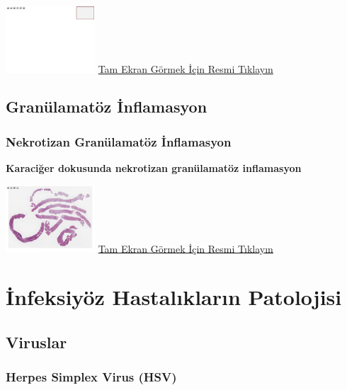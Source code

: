 \documentclass[
  letterpaper,
  DIV=11,
  numbers=noendperiod]{scrreprt}
\begin{document}
\href{https://images.patolojiatlasi.com/template/HE.html}{\includegraphics[width=0.25\textwidth,height=\textheight]{./screenshots/template_screenshot.png}}
\href{https://images.patolojiatlasi.com/chronic-pyelonephritis/HE.html}{Tam
Ekran Görmek İçin Resmi Tıklayın}

\hypertarget{sec-granulamatoz-inflamasyon}{%
\chapter{Granülamatöz İnflamasyon}\label{sec-granulamatoz-inflamasyon}}

\hypertarget{sec-nekrotizan-granulamatoz-inflamasyon}{%
\section{Nekrotizan Granülamatöz
İnflamasyon}\label{sec-nekrotizan-granulamatoz-inflamasyon}}

\textbf{Karaciğer dokusunda nekrotizan granülamatöz inflamasyon}

\href{https://images.patolojiatlasi.com/necrotisinggranuloma/HE.html}{\includegraphics[width=0.25\textwidth,height=\textheight]{./screenshots/necrotisinggranuloma_screenshot.png}}
\href{https://images.patolojiatlasi.com/necrotisinggranuloma/HE.html}{Tam
Ekran Görmek İçin Resmi Tıklayın}

\part{İnfeksiyöz Hastalıkların Patolojisi}

\hypertarget{sec-viruslar}{%
\chapter{Viruslar}\label{sec-viruslar}}

\hypertarget{sec-herpes-simplex-virus}{%
\section{Herpes Simplex Virus (HSV)}\label{sec-herpes-simplex-virus}}
\end{document}
